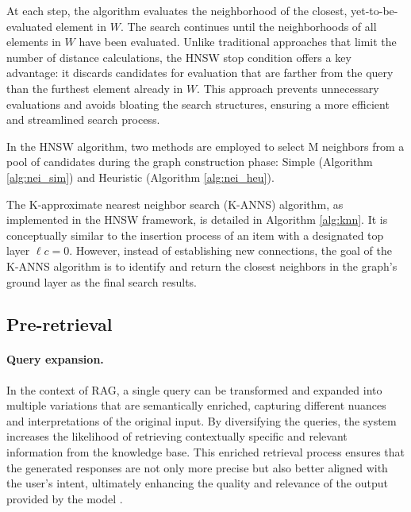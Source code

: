 At each step, the algorithm evaluates the neighborhood of the closest, yet-to-be-evaluated element in $W$. The search continues until the neighborhoods of all elements in $W$ have been evaluated. Unlike traditional approaches that limit the number of distance calculations, the HNSW stop condition offers a key advantage: it discards candidates for evaluation that are farther from the query than the furthest element already in $W$. This approach prevents unnecessary evaluations and avoids bloating the search structures, ensuring a more efficient and streamlined search process.

In the HNSW algorithm, two methods are employed to select M neighbors from a pool of candidates during the graph construction phase: Simple (Algorithm \ref{alg:nei_sim}) and Heuristic (Algorithm \ref{alg:nei_heu}).




The K-approximate nearest neighbor search (K-ANNS) algorithm, as implemented in the HNSW framework, is detailed in Algorithm \ref{alg:knn}. It is conceptually similar to the insertion process of an item with a designated top layer $\ell{c}=0$. However, instead of establishing new connections, the goal of the K-ANNS algorithm is to identify and return the closest neighbors in the graph's ground layer as the final search results.



\subsection{Pre-retrieval}

\paragraph*{Query expansion.} In the context of RAG, a single query can be transformed and expanded into multiple variations that are semantically enriched, capturing different nuances and interpretations of the original input. By diversifying the queries, the system increases the likelihood of retrieving contextually specific and relevant information from the knowledge base. This enriched retrieval process ensures that the generated responses are not only more precise but also better aligned with the user's intent, ultimately enhancing the quality and relevance of the output provided by the model \cite{gao2023ragllmsurvey}.

